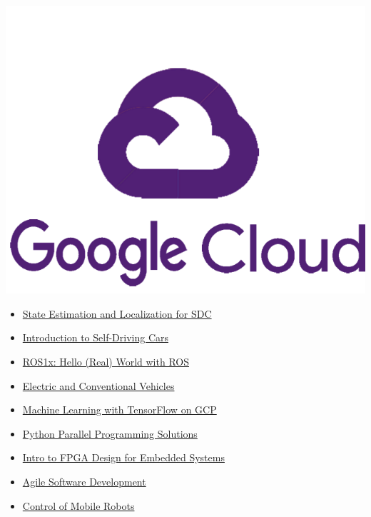 \includegraphics[scale=0.065]{img/1280px-Google_Cloud_Logo.png}

\begin{itemize}

\item{\href{https://www.coursera.org/account/accomplishments/certificate/NRZGQ2ZR2S99}{State Estimation and Localization for SDC}}

\item{\href{https://www.coursera.org/account/accomplishments/certificate/WDDB3RKY7747}{Introduction to Self-Driving Cars}}

\item{\href{https://courses.edx.org/certificates/72dac216a4e9446fa5792921926b2bb3}{ROS1x: Hello (Real) World with ROS}}

\item{\href{https://courses.edx.org/certificates/3d94e47ded1e49649d358c7d8fd12989}{Electric and Conventional Vehicles}}

\item{\href{https://www.coursera.org/account/accomplishments/specialization/PLESFRLGX57Y?utm_medium=certificate&utm_source=link&utm_campaign=copybutton_certificate&utm_term=long}{Machine Learning with TensorFlow on GCP}}

\item{\href{http://www.linkedin.com/learning/python-parallel-programming-solutions}{Python Parallel Programming Solutions}}

\item{\href{https://www.coursera.org/account/accomplishments/verify/G5QLQYHBYCJR?utm_medium=certificate&utm_source=link&utm_campaign=copybutton_certificate&utm_term=long}{Intro to FPGA Design for Embedded Systems}}


\item{\href{https://www.coursera.org/account/accomplishments/certificate/3V9G5VAVE93F}{Agile Software Development}}
\item{\href{https://www.coursera.org/account/accomplishments/certificate/J6YH5LSNL4CF}{Control of Mobile Robots}}
\end{itemize}

